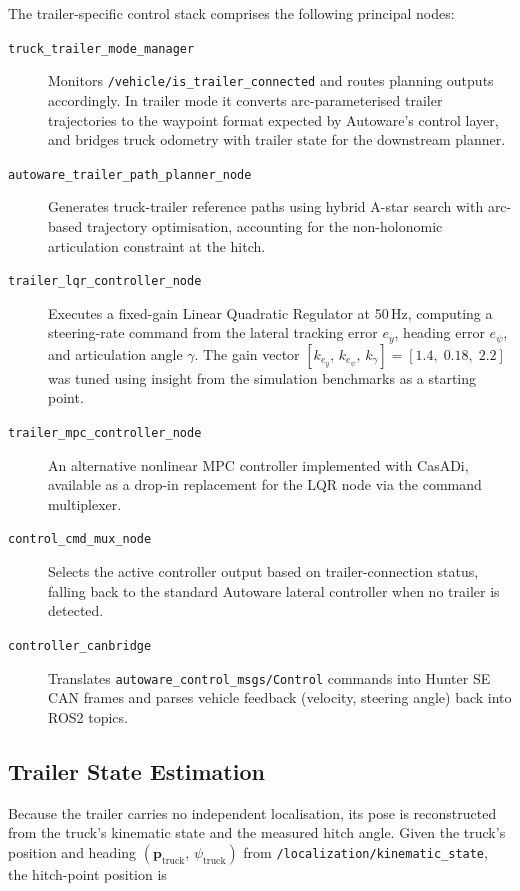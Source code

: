 The trailer-specific control stack comprises the following principal nodes:

\begin{description}
    \item[\texttt{truck\_trailer\_mode\_manager}] Monitors \texttt{/vehicle/is\_trailer\_connected} and routes planning outputs accordingly. In trailer mode it converts arc-parameterised trailer trajectories to the waypoint format expected by Autoware's control layer, and bridges truck odometry with trailer state for the downstream planner.

    \item[\texttt{autoware\_trailer\_path\_planner\_node}] Generates truck-trailer reference paths using hybrid A-star search with arc-based trajectory optimisation, accounting for the non-holonomic articulation constraint at the hitch.

    \item[\texttt{trailer\_lqr\_controller\_node}] Executes a fixed-gain Linear Quadratic Regulator at 50\,Hz, computing a steering-rate command from the lateral tracking error $e_y$, heading error $e_\psi$, and articulation angle $\gamma$. The gain vector $[k_{e_y},\, k_{e_\psi},\, k_\gamma] = [1.4,\; 0.18,\; 2.2]$ was tuned using insight from the simulation benchmarks as a starting point.

    \item[\texttt{trailer\_mpc\_controller\_node}] An alternative nonlinear MPC controller implemented with CasADi, available as a drop-in replacement for the LQR node via the command multiplexer.

    \item[\texttt{control\_cmd\_mux\_node}] Selects the active controller output based on trailer-connection status, falling back to the standard Autoware lateral controller when no trailer is detected.

    \item[\texttt{controller\_canbridge}] Translates \texttt{autoware\_control\_msgs/Control} commands into Hunter SE CAN frames and parses vehicle feedback (velocity, steering angle) back into ROS2 topics.
\end{description}

\subsection{Trailer State Estimation}

Because the trailer carries no independent localisation, its pose is reconstructed from the truck's kinematic state and the measured hitch angle. Given the truck's position and heading $(\mathbf{p}_\text{truck},\, \psi_\text{truck})$ from \texttt{/localization/kinematic\_state}, the hitch-point position is

